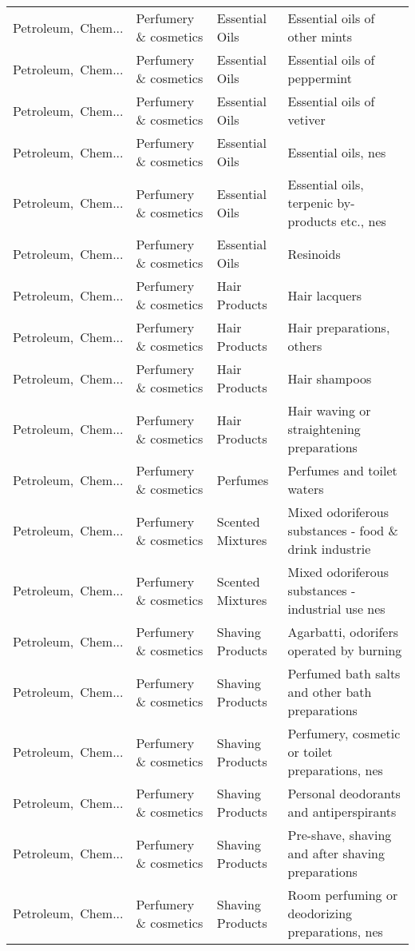 \begin{appendices}
\begin{xltabular}{\textwidth}{|p{0.10\textwidth}|p{0.25\textwidth}|p{0.24\textwidth}|p{0.31\textwidth}|}
Petroleum,\ Chem... & Perfumery \& cosmetics & Essential Oils & Essential oils of other mints \\
Petroleum,\ Chem... & Perfumery \& cosmetics & Essential Oils & Essential oils of peppermint \\
Petroleum,\ Chem... & Perfumery \& cosmetics & Essential Oils & Essential oils of vetiver \\
Petroleum,\ Chem... & Perfumery \& cosmetics & Essential Oils & Essential oils, nes \\
Petroleum,\ Chem... & Perfumery \& cosmetics & Essential Oils & Essential oils, terpenic by-products etc., nes \\
Petroleum,\ Chem... & Perfumery \& cosmetics & Essential Oils & Resinoids \\
Petroleum,\ Chem... & Perfumery \& cosmetics & Hair Products & Hair lacquers \\
Petroleum,\ Chem... & Perfumery \& cosmetics & Hair Products & Hair preparations, others \\
Petroleum,\ Chem... & Perfumery \& cosmetics & Hair Products & Hair shampoos \\
Petroleum,\ Chem... & Perfumery \& cosmetics & Hair Products & Hair waving or straightening preparations \\
Petroleum,\ Chem... & Perfumery \& cosmetics & Perfumes & Perfumes and toilet waters \\
Petroleum,\ Chem... & Perfumery \& cosmetics & Scented Mixtures & Mixed odoriferous substances - food \& drink industrie \\
Petroleum,\ Chem... & Perfumery \& cosmetics & Scented Mixtures & Mixed odoriferous substances - industrial use nes \\
Petroleum,\ Chem... & Perfumery \& cosmetics & Shaving Products & Agarbatti, odorifers operated by burning \\
Petroleum,\ Chem... & Perfumery \& cosmetics & Shaving Products & Perfumed bath salts and other bath preparations \\
Petroleum,\ Chem... & Perfumery \& cosmetics & Shaving Products & Perfumery, cosmetic or toilet preparations, nes \\
Petroleum,\ Chem... & Perfumery \& cosmetics & Shaving Products & Personal deodorants and antiperspirants \\
Petroleum,\ Chem... & Perfumery \& cosmetics & Shaving Products & Pre-shave, shaving and after shaving preparations \\
Petroleum,\ Chem... & Perfumery \& cosmetics & Shaving Products & Room perfuming or deodorizing preparations, nes \\

\end{xltabular}
\end{appendices}

